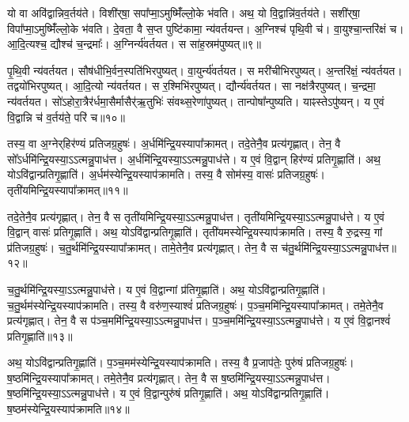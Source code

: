 यो वा अवि॑द्वान्निव॒र्तय॑ते।
विशी॑र्‌\mbox{}षा॒ सपा᳚प्मा॒\-ऽमुष्मिँ॑ल्लो॒के भ॑वति।
अथ॒ यो वि॒द्वान्नि॑व॒र्तय॑ते।
सशी॑र्‌\mbox{}षा॒ विपा᳚प्मा॒\-ऽमुष्मिँ॑ल्लो॒के भ॑वति।
दे॒वता॒ वै स॒प्त पुष्टि॑कामा॒ न्य॑वर्तयन्त।
अ॒ग्निश्च॑ पृथि॒वी च॑।
वा॒युश्चा॒न्तरि॑क्षं च।
आ॒दि॒त्यश्च॒ द्यौश्च॑ च॒न्द्रमाः᳚।
अ॒ग्निर्न्य॑वर्तयत।
स सा॑ह॒स्रम॑पुष्यत्॥९॥\ip

पृ॒थि॒वी न्य॑वर्तयत।
सौष॑धीभि॒र्वन॒स्पति॑भि\-र\-पुष्यत्।
वा॒युर्न्य॑\-वर्तयत।
स मरी॑चीभिरपुष्यत्।
अ॒न्तरि॑क्षं॒ न्य॑वर्तयत।
तद्वयो॑भिर\-पुष्यत्।
आ॒दि॒त्यो न्य॑वर्तयत।
स र॒श्मिभि॑रपुष्यत्।
द्यौर्न्य॑\-वर्तयत।
सा नक्ष॑त्रैरपुष्यत्।
च॒न्द्रमा॒ न्य॑वर्तयत।
सो॑ऽहोरा॒त्रैर॑र्ध\-मा॒सैर्मासैर्॑\-ऋ॒तुभिः॑ संवथ्स॒रेणा॑पुष्यत्।
तान्पोषा᳚न्पुष्यति।
याꣴस्ते\-ऽपु॑ष्यन्।
य ए॒वं वि॒द्वान्नि च॑ व॒र्तय॑ते॒ परि॑ च॥१०॥\ip\anuvakamend[अ॒पु॒ष्य॒न्नक्ष॑त्रैरपुष्य॒त्पञ्च॑ च]

तस्य॒ वा अ॒ग्नेर्‌\mbox{}हिर॑ण्यं प्रतिजग्र॒हुषः॑।
अ॒र्धमि॑न्द्रि॒य\-स्यापा᳚\-क्रामत्।
तदे॒तेनै॒व प्रत्य॑गृह्णात्।
तेन॒ वै सो᳚\-ऽर्धमि॑न्द्रि॒य\-स्या॒\-ऽऽत्मन्नु॒पा\-ध॑त्त।
अ॒र्धमि॑न्द्रि॒य\-स्या॒\-ऽऽत्मन्नु॒पा\-ध॑त्ते।
य ए॒वं वि॒द्वान् हिर॑ण्यं प्रति\-गृ॒ह्णाति॑।
अथ॒ योऽवि॑द्वान्प्रति\-गृ॒ह्णाति॑।
अ॒र्धम॑स्येन्द्रि॒य\-स्याप॑\-क्रामति।
तस्य॒ वै सोम॑स्य॒ वासः॑ प्रतिजग्र॒हुषः॑।
तृती॑यमिन्द्रि॒य\-स्यापा᳚क्रामत्॥११॥\ip

तदे॒तेनै॒व प्रत्य॑गृह्णात्।
तेन॒ वै स तृती॑यमिन्द्रि॒य\-स्या॒\-ऽऽत्मन्नु॒पा\-ध॑त्त।
तृती॑यमिन्द्रि॒य\-स्या॒\-ऽऽत्मन्नु॒पा\-ध॑त्ते।
य ए॒वं वि॒द्वान् वासः॑ प्रति\-गृ॒ह्णाति॑।
अथ॒ योऽवि॑द्वान्प्रति\-गृ॒ह्णाति॑।
तृती॑यमस्येन्द्रि॒य\-स्याप॑\-क्रामति।
तस्य॒ वै रु॒द्रस्य॒ गां प्र॑तिजग्र॒हुषः॑।
च॒तु॒र्थमि॑न्द्रि॒य\-स्यापा᳚\-क्रामत्।
तामे॒तेनै॒व प्रत्य॑गृह्णात्।
तेन॒ वै स च॑तु॒र्थमि॑न्द्रि॒य\-स्या॒\-ऽऽत्मन्नु॒पा\-ध॑त्त॥१२॥\ip

च॒तु॒र्थमि॑न्द्रि॒य\-स्या॒\-ऽऽत्मन्नु॒पा\-ध॑त्ते।
य ए॒वं वि॒द्वान्गां प्र॑तिगृ॒ह्णाति॑।
अथ॒ योऽवि॑द्वान्प्रति\-गृ॒ह्णाति॑।
च॒तु॒र्थम॑स्येन्द्रि॒य\-स्याप॑\-क्रामति।
तस्य॒ वै वरु॑ण॒स्याश्वं॑ प्रतिजग्र॒हुषः॑।
प॒ञ्च॒ममि॑\-न्द्रि॒य\-स्यापा᳚\-क्रामत्।
तमे॒तेनै॒व प्रत्य॑गृह्णात्।
तेन॒ वै स प॑ञ्च॒ममि॑न्द्रि॒य\-स्या॒\-ऽऽत्मन्नु॒पा\-ध॑त्त।
प॒ञ्च॒ममि॑\-न्द्रि॒य\-स्या॒\-ऽऽत्मन्नु॒पा\-ध॑त्ते।
य ए॒वं वि॒द्वानश्वं॑ प्रति\-गृ॒ह्णाति॑॥१३॥\ip

अथ॒ योऽवि॑द्वान्प्रति\-गृ॒ह्णाति॑।
प॒ञ्च॒मम॑स्येन्द्रि॒य\-स्याप॑\-क्रामति।
तस्य॒ वै प्र॒जा\-प॑तेः॒ पुरु॑षं प्रति\-जग्र॒हुषः॑।
ष॒ष्ठमि॑न्द्रि॒य\-स्यापा᳚क्रामत्।
तमे॒तेनै॒व प्रत्य॑गृह्णात्।
तेन॒ वै स ष॒ष्ठमि॑न्द्रि॒य\-स्या॒\-ऽऽत्मन्नु॒पा\-ध॑त्त।
ष॒ष्ठमि॑न्द्रि॒य\-स्या॒\-ऽऽत्मन्नु॒पा\-ध॑त्ते।
य ए॒वं वि॒द्वान्पुरु॑षं प्रति\-गृ॒ह्णाति॑।
अथ॒ योऽवि॑द्वान्प्रति\-गृ॒ह्णाति॑।
ष॒ष्ठम॑स्येन्द्रि॒य\-स्याप॑\-क्रामति॥१४॥\ip

